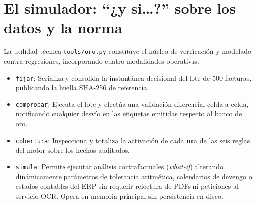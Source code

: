 \documentclass[11pt,a4paper]{article}
\begin{document}
\section{El simulador: ``¿y si\dots?'' sobre los datos y la norma}

La utilidad técnica \texttt{tools/oro.py} constituye el núcleo de verificación y modelado contra regresiones, incorporando cuatro modalidades operativas:
\begin{itemize}
    \item \texttt{fijar}: Serializa y consolida la instantánea decisional del lote de 500 facturas, publicando la huella SHA-256 de referencia.
    \item \texttt{comprobar}: Ejecuta el lote y efectúa una validación diferencial celda a celda, notificando cualquier desvío en las etiquetas emitidas respecto al banco de oro.
    \item \texttt{cobertura}: Inspecciona y totaliza la activación de cada una de las seis reglas del motor sobre los hechos auditados.
    \item \texttt{simula}: Permite ejecutar análisis contrafactuales (\textit{what-if}) alterando dinámicamente parámetros de tolerancia aritmética, calendarios de devengo o estados contables del ERP sin requerir relectura de PDFs ni peticiones al servicio OCR. Opera en memoria principal sin persistencia en disco.
\end{itemize}
\end{document}
